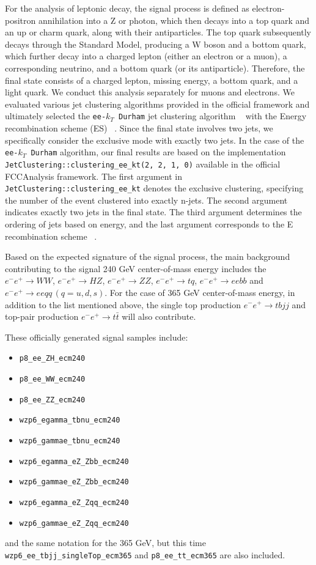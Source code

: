 \documentclass[11pt,onecolumn,english,showpacs,preprintnumbers,amsmath,amssymb,floatfix,nofootinbib]{revtex4-1}
\begin{document}
For the analysis of leptonic decay, the signal process is defined as electron-positron annihilation into a Z or photon, which then decays into a top quark and an up or charm quark, along with their antiparticles. The top quark subsequently decays through the Standard Model, producing a W boson and a bottom quark, which further decay into a charged lepton (either an electron or a muon), a corresponding neutrino, and a bottom quark (or its antiparticle). Therefore, the final state consists of a charged lepton, missing energy, a bottom quark, and a light quark. We conduct this analysis separately for muons and electrons.
We evaluated various jet clustering algorithms provided in the official framework and ultimately selected the {\tt ee-$k_T$ Durham} jet clustering algorithm ~\cite{Catani:1991hj, Lai:2021rko} with the Energy recombination scheme (ES) ~\cite{Tenchini}. Since the final state involves two jets, we specifically consider the exclusive mode with exactly two jets. In the case of the {\tt ee-$k_T$ Durham}  algorithm, our final results are based on the implementation {\tt JetClustering::clustering\_ee\_kt(2, 2, 1, 0)} available in the official FCCAnalysis framework. The first argument in {\tt JetClustering::clustering\_ee\_kt} denotes the exclusive clustering, specifying the number of the event clustered into exactly n-jets. The second argument indicates exactly two jets in the final state. The third argument determines the ordering of jets based on energy, and the last argument corresponds to the E recombination scheme ~\cite{Tenchini}.

Based on the expected signature of the signal process, the 
main background contributing to the signal 240 GeV center-of-mass energy includes the
$e^- e^+ \rightarrow WW$, $e^- e^+ \rightarrow HZ$, $e^- e^+ \rightarrow ZZ$,
$e^- e^+ \rightarrow tq$, $e^- e^+ \rightarrow eebb$ and $e^- e^+ \rightarrow eeqq \, (q=u, d, s)$.
For the case of 365 GeV center-of-mass energy, in addition to the list mentioned above, the single top 
production $e^- e^+ \rightarrow tbjj$ and top-pair production $e^- e^+ \rightarrow t\bar{t}$ will also contribute. 

These officially generated signal samples include:

\begin{itemize}
\item  {\tt p8\_ee\_ZH\_ecm240}
\item  {\tt p8\_ee\_WW\_ecm240}
\item  {\tt p8\_ee\_ZZ\_ecm240}
\item  {\tt wzp6\_egamma\_tbnu\_ecm240}
\item  {\tt wzp6\_gammae\_tbnu\_ecm240}
\item  {\tt wzp6\_egamma\_eZ\_Zbb\_ecm240}
\item  {\tt wzp6\_gammae\_eZ\_Zbb\_ecm240}
\item  {\tt wzp6\_egamma\_eZ\_Zqq\_ecm240}
\item  {\tt wzp6\_gammae\_eZ\_Zqq\_ecm240}
\end{itemize}
and the same notation for the 365 GeV, but this time  
{\tt wzp6\_ee\_tbjj\_singleTop\_ecm365} and {\tt p8\_ee\_tt\_ecm365} are also included.
\end{document}
